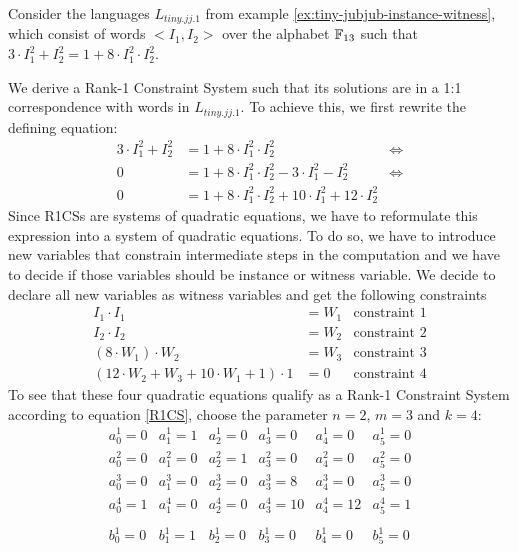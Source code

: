 \begin{example}
\label{ex:TJJ-r1cs}
 Consider the languages $L_{tiny.jj.1}$ from example \ref{ex:tiny-jubjub-instance-witness}, which consist of words $<I_1,I_2>$ over the alphabet $\mathbb{F}_{13}$ such that $3\cdot I_1^2 + I_2^2 = 1 + 8\cdot I_1^2\cdot I_2^2$. 

We derive a Rank-1 Constraint System such that its solutions are in a 1:1 correspondence with words in $L_{tiny.jj.1}$.  To achieve this, we first rewrite the defining equation:
\begin{align*}
3\cdot I_1^2 + I_2^2  & = 1 + 8\cdot I_1^2\cdot I_2^2 & \Leftrightarrow \\
 0 & = 1 + 8\cdot I_1^2\cdot I_2^2 - 3\cdot I_1^2 - I_2^2  & \Leftrightarrow \\
 0 & = 1 + 8\cdot I_1^2\cdot I_2^2 + 10\cdot I_1^2 +12\cdot I_2^2
\end{align*}
Since R1CSs are systems of quadratic equations, we have to reformulate this expression into a system of quadratic equations. To do so, we have to introduce new variables that constrain intermediate steps in the computation and we have to decide if those variables should be instance or witness variable. We decide to declare all new variables as witness variables and get the following constraints
\begin{align*}
I_1 \cdot I_1 & = W_1 & \text{constraint } 1\\
I_2 \cdot I_2 & = W_2 & \text{constraint } 2\\
(8 \cdot W_1) \cdot W_2 & = W_3 & \text{constraint } 3\\
(12\cdot W_2 + W_3 + 10\cdot W_1 + 1)\cdot 1 & = 0 & \text{constraint } 4
\end{align*}
To see that these four quadratic equations qualify as a Rank-1 Constraint System according to equation \ref{R1CS}, choose the parameter $n=2$, $m=3$ and $k=4$:
$$
\begin{array}{llllll}
a_0^1 = 0 & a_1^1= 1 & a_2^1= 0 & a_3^1 = 0 & a_4^1= 0  & a_5^1= 0 \\ 
a_0^2 = 0 & a_1^2= 0 & a_2^2= 1 & a_3^2 = 0 & a_4^2= 0  & a_5^2= 0 \\ 
a_0^3 = 0 & a_1^3= 0 & a_2^3= 0 & a_3^3 = 8 & a_4^3= 0  & a_5^3= 0 \\ 
a_0^4 = 1 & a_1^4= 0 & a_2^4= 0 & a_3^4 = 10 & a_4^4= 12  & a_5^4= 1 \\ 
\\
b_0^1 = 0 & b_1^1= 1 & b_2^1= 0 & b_3^1 = 0 & b_4^1= 0  & b_5^1= 0 \\ 

\end{array}$$
\end{example}
